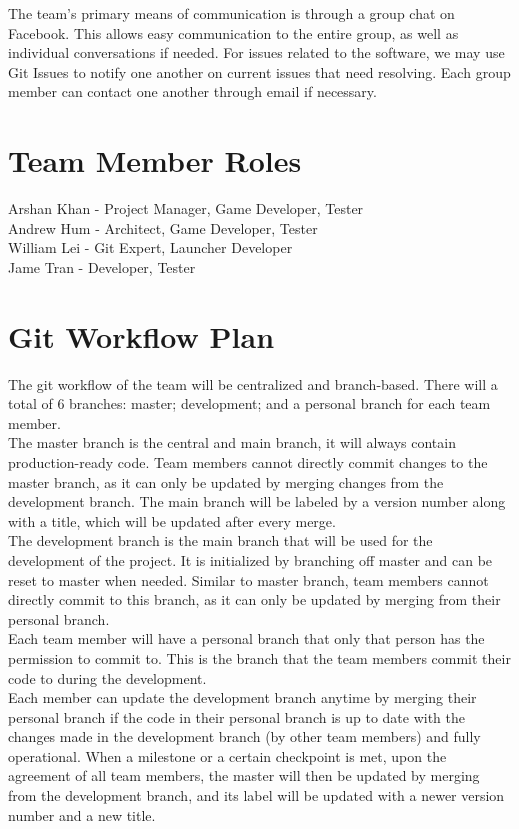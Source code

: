 \documentclass{article}
\begin{document}
The team's primary means of communication is through a group chat on Facebook. This allows easy communication to the entire group, as well as individual conversations if needed. For issues related to the software, we may use Git Issues to notify one another on current issues that need resolving. Each group member can contact one another through email if necessary.

\section{Team Member Roles}

Arshan Khan - Project Manager, Game Developer, Tester \\
Andrew Hum - Architect, Game Developer, Tester \\
William Lei - Git Expert, Launcher Developer \\
Jame Tran - Developer, Tester

\section{Git Workflow Plan}

The git workflow of the team will be centralized and branch-based. There will a total of 6 branches: master; development; and a personal branch for each team member.\\
The master branch is the central and main branch, it will always contain production-ready code. Team members cannot directly commit changes to the master branch, as it can only be updated by merging changes from the development branch. The main branch will be labeled by a version number along with a title, which will be updated after every merge.\\
The development branch is the main branch that will be used for the development of the project. It is initialized by branching off master and can be reset to master when needed. Similar to master branch, team members cannot directly commit to this branch, as it can only be updated by merging from their personal branch.\\
Each team member will have a personal branch that only that person has the permission to commit to. This is the branch that the team members commit their code to during the development.\\
Each member can update the development branch anytime by merging their personal branch if the code in their personal branch is up to date with the changes made in the development branch (by other team members) and fully operational. When a milestone or a certain checkpoint is met, upon the agreement of all team members, the master will then be updated by merging from the development branch, and its label will be updated with a newer version number and a new title.
\end{document}
